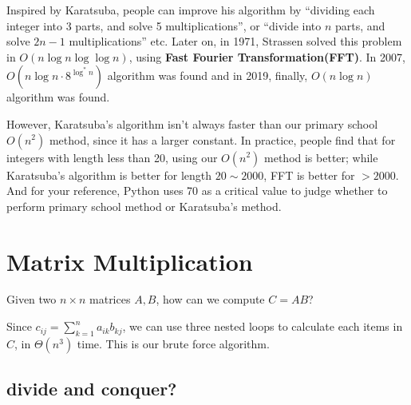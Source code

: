 \begin{spacing}{1.3}
    Inspired by Karatsuba, people can improve his algorithm by 
    ``dividing each integer into 3 parts, and solve 5 multiplications'',
    or ``divide into $n$ parts, and solve $2n-1$ multiplications'' etc.
    Later on, in 1971, Strassen solved this problem in 
    $O(n\log n\log \log n)$, using {\bf Fast Fourier Transformation(FFT)}.
    In 2007, $O(n\log n\cdot 8^{\log ^* n})$ algorithm was found 
    and in 2019, finally, $O(n\log n)$ algorithm was found.

    However, Karatsuba's algorithm isn't always faster than 
    our primary school $O(n^2)$ method, since it has a larger 
    constant. In practice, people find that for integers with
    length less than 20, using our $O(n^2)$ method is better;
    while Karatsuba's algorithm is better for length $20\sim 2000$,
    FFT is better for $>2000$. And for your reference, Python 
    uses 70 as a critical value to judge whether to perform 
    primary school method or Karatsuba's method.

    \newpage
    \section{Matrix Multiplication}

    Given two $n\times n$ matrices $A, B$, how can we compute 
    $C=AB$?
    
    Since $c_{ij}=\sum_{k=1}^{n}a_{ik}b_{kj}$, 
    we can use three nested loops to calculate each items in $C$,
    in $\Theta(n^3)$ time. This is our brute force algorithm.

    \subsection{divide and conquer?}


\end{spacing}
